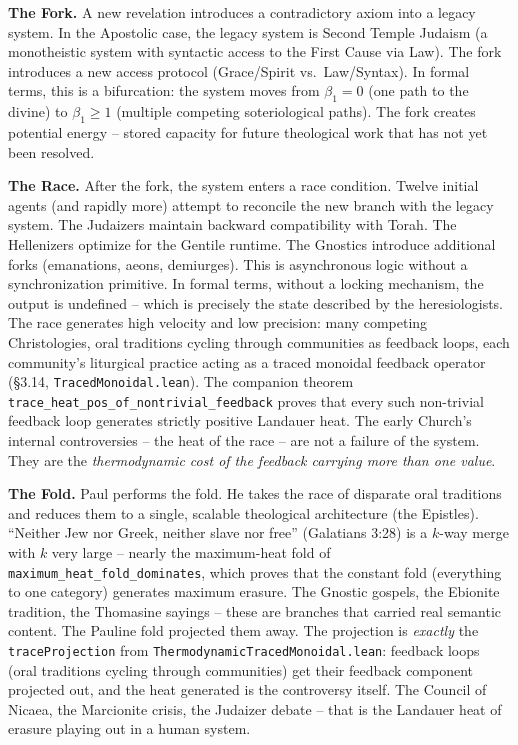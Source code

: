 \documentclass[
  11pt,
]{article}
\begin{document}
\textbf{The Fork.} A new revelation introduces a contradictory axiom
into a legacy system. In the Apostolic case, the legacy system is Second
Temple Judaism (a monotheistic system with syntactic access to the First
Cause via Law). The fork introduces a new access protocol (Grace/Spirit
vs.~Law/Syntax). In formal terms, this is a bifurcation: the system
moves from \(\beta_1 = 0\) (one path to the divine) to
\(\beta_1 \geq 1\) (multiple competing soteriological paths). The fork
creates potential energy -- stored capacity for future theological work
that has not yet been resolved.

\textbf{The Race.} After the fork, the system enters a race condition.
Twelve initial agents (and rapidly more) attempt to reconcile the new
branch with the legacy system. The Judaizers maintain backward
compatibility with Torah. The Hellenizers optimize for the Gentile
runtime. The Gnostics introduce additional forks (emanations, aeons,
demiurges). This is asynchronous logic without a synchronization
primitive. In formal terms, without a locking mechanism, the output is
undefined -- which is precisely the state described by the
heresiologists. The race generates high velocity and low precision: many
competing Christologies, oral traditions cycling through communities as
feedback loops, each community's liturgical practice acting as a traced
monoidal feedback operator (§3.14, \texttt{TracedMonoidal.lean}). The
companion theorem \texttt{trace\_heat\_pos\_of\_nontrivial\_feedback}
proves that every such non-trivial feedback loop generates strictly
positive Landauer heat. The early Church's internal controversies -- the
heat of the race -- are not a failure of the system. They are the
\emph{thermodynamic cost of the feedback carrying more than one value}.

\textbf{The Fold.} Paul performs the fold. He takes the race of
disparate oral traditions and reduces them to a single, scalable
theological architecture (the Epistles). ``Neither Jew nor Greek,
neither slave nor free'' (Galatians 3:28) is a \(k\)-way merge with
\(k\) very large -- nearly the maximum-heat fold of
\texttt{maximum\_heat\_fold\_dominates}, which proves that the constant
fold (everything to one category) generates maximum erasure. The Gnostic
gospels, the Ebionite tradition, the Thomasine sayings -- these are
branches that carried real semantic content. The Pauline fold projected
them away. The projection is \emph{exactly} the \texttt{traceProjection}
from \texttt{ThermodynamicTracedMonoidal.lean}: feedback loops (oral
traditions cycling through communities) get their feedback component
projected out, and the heat generated is the controversy itself. The
Council of Nicaea, the Marcionite crisis, the Judaizer debate -- that is
the Landauer heat of erasure playing out in a human system.
\end{document}
